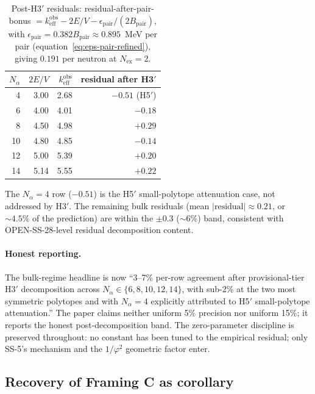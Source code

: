 \documentclass[11pt,letterpaper]{article}
\theoremstyle{definition}
\newcommand{\phig}{\varphi}
\newcommand{\Bpair}{B_{\text{pair}}}
\newcommand{\Nalpha}{N_\alpha}
\newcommand{\Nex}{N_{\text{ex}}}
\begin{document}
\begin{table}[h]
\centering
\caption{Post-H3$'$ residuals: residual-after-pair-bonus $= k_{\text{eff}}^{\text{obs}} - 2E/V - \epsilon_{\text{pair}}/(2\Bpair)$, with $\epsilon_{\text{pair}} = 0.382\Bpair \approx 0.895$~MeV per pair (equation~\ref{eq:eps-pair-refined}), giving $0.191$ per neutron at $\Nex = 2$.}
\label{tab:k-eff-with-h3prime}
\begin{tabular}{@{}rrrr@{}}
\toprule
$\Nalpha$ & $2E/V$ & $k_{\text{eff}}^{\text{obs}}$ & residual after H3$'$ \\
\midrule
4 & 3.00 & 2.68 & $-0.51$ (H5$'$) \\
6 & 4.00 & 4.01 & $-0.18$ \\
8 & 4.50 & 4.98 & $+0.29$ \\
10 & 4.80 & 4.85 & $-0.14$ \\
12 & 5.00 & 5.39 & $+0.20$ \\
14 & 5.14 & 5.55 & $+0.22$ \\
\bottomrule
\end{tabular}
\end{table}

The $\Nalpha = 4$ row ($-0.51$) is the H5$'$ small-polytope attenuation case, not addressed by H3$'$. The remaining bulk residuals (mean $|{\text{residual}}| \approx 0.21$, or $\sim 4.5\%$ of the prediction) are within the $\pm 0.3$ ($\sim$6\%) band, consistent with OPEN-SS-28-level residual decomposition content.

\paragraph{Honest reporting.}

The bulk-regime headline is now ``3--7\% per-row agreement after provisional-tier H3$'$ decomposition across $\Nalpha \in \{6, 8, 10, 12, 14\}$, with sub-2\% at the two most symmetric polytopes and with $\Nalpha = 4$ explicitly attributed to H5$'$ small-polytope attenuation.'' The paper claims neither uniform 5\% precision nor uniform 15\%; it reports the honest post-decomposition band. The zero-parameter discipline is preserved throughout: no constant has been tuned to the empirical residual; only SS-5's mechanism and the $1/\phig^2$ geometric factor enter.

\subsection{Recovery of Framing C as corollary}
\label{sec:recovery-of-C}
\end{document}
